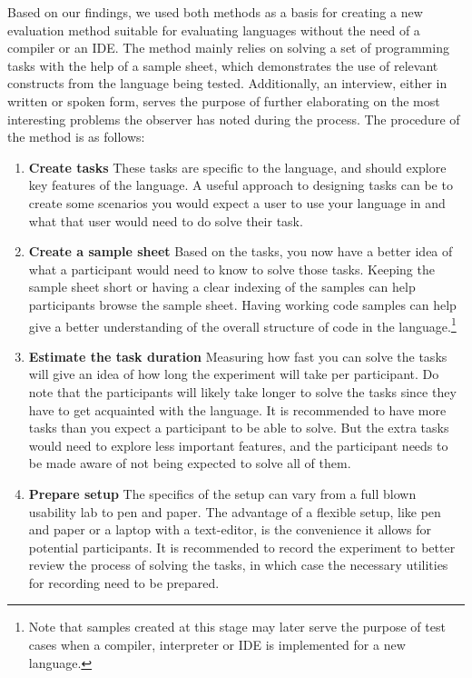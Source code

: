 \documentclass[10pt]{sigplanconf}
\begin{document}
Based on our findings, we used both methods as a basis for creating a new evaluation method suitable for evaluating languages without the need of a compiler or an IDE. The method mainly relies on solving a set of programming tasks with the help of a sample sheet, which demonstrates the use of relevant constructs from the language being tested. Additionally, an interview, either in written or spoken form, serves the purpose of further elaborating on the most interesting problems the observer has noted during the process. The procedure of the method is as follows:

\begin{enumerate}
\item \textbf{Create tasks} These tasks are specific to the language, and should explore key features of the language. A useful approach to designing tasks can be to create some scenarios you would expect a user to use your language in and what that user would need to do solve their task.
\item \textbf{Create a sample sheet} Based on the tasks, you now have a better idea of what a participant would need to know to solve those tasks. Keeping the sample sheet short or having a clear indexing of the samples can help participants browse the sample sheet. Having working code samples can help give a better understanding of the overall structure of code in the language.\footnote{Note that samples created at this stage may later serve the purpose of test cases when a compiler, interpreter or IDE is implemented for a new language.}
\item \textbf{Estimate the task duration} Measuring how fast you can solve the tasks will give an idea of how long the experiment will take per participant. Do note that the participants will likely take longer to solve the tasks since they have to get acquainted with the language. It is recommended to have more tasks than you expect a participant to be able to solve. But the extra tasks would need to explore less important features, and the participant needs to be made aware of not being expected to solve all of them.
\item \textbf{Prepare setup} The specifics of the setup can vary from a full blown usability lab to pen and paper. The advantage of a flexible setup, like pen and paper or a laptop with a text-editor, is the convenience it allows for potential participants. It is recommended to record the experiment to better review the process of solving the tasks, in which case the necessary utilities for recording need to be prepared.

\end{enumerate}
\end{document}
